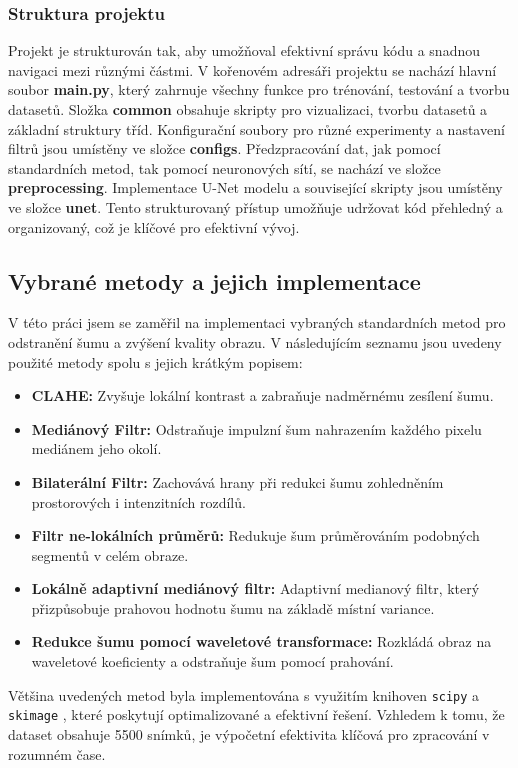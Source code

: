 \documentclass[male,czech,api_ing]{thesis}
\begin{document}
\subsubsection{Struktura projektu}
Projekt je strukturován tak, aby umožňoval efektivní správu kódu a snadnou navigaci mezi různými částmi. V kořenovém adresáři projektu se nachází hlavní soubor \textbf{main.py}, který zahrnuje všechny funkce pro trénování, testování a tvorbu datasetů. Složka \textbf{common} obsahuje skripty pro vizualizaci, tvorbu datasetů a základní struktury tříd. Konfigurační soubory pro různé experimenty a nastavení filtrů jsou umístěny ve složce \textbf{configs}. Předzpracování dat, jak pomocí standardních metod, tak pomocí neuronových sítí, se nachází ve složce \textbf{preprocessing}. Implementace U-Net modelu a související skripty jsou umístěny ve složce \textbf{unet}. Tento strukturovaný přístup umožňuje udržovat kód přehledný a organizovaný, což je klíčové pro efektivní vývoj.

\subsection{Vybrané metody a jejich implementace}
V této práci jsem se zaměřil na implementaci vybraných standardních metod pro odstranění šumu a zvýšení kvality obrazu. V následujícím seznamu jsou uvedeny použité metody spolu s jejich krátkým popisem: 

\begin{itemize}
    \item \textbf{CLAHE:} Zvyšuje lokální kontrast a zabraňuje nadměrnému zesílení šumu.
    \item \textbf{Mediánový Filtr:} Odstraňuje impulzní šum nahrazením každého pixelu mediánem jeho okolí.
    \item \textbf{Bilaterální Filtr:} Zachovává hrany při redukci šumu zohledněním prostorových i intenzitních rozdílů.
    \item \textbf{Filtr ne-lokálních průměrů:} Redukuje šum průměrováním podobných segmentů v celém obraze.
    \item \textbf{Lokálně adaptivní mediánový filtr:} Adaptivní medianový filtr, který přizpůsobuje prahovou hodnotu šumu na základě místní variance.
    \item \textbf{Redukce šumu pomocí waveletové transformace:} Rozkládá obraz na waveletové koeficienty a odstraňuje šum pomocí prahování.
\end{itemize}

Většina uvedených metod byla implementována s využitím knihoven \texttt{scipy} \cite{scipy} a \texttt{skimage} \cite{scikit}, které poskytují optimalizované a efektivní řešení. Vzhledem k tomu, že dataset obsahuje 5500 snímků, je výpočetní efektivita klíčová pro zpracování v rozumném čase.
\end{document}
